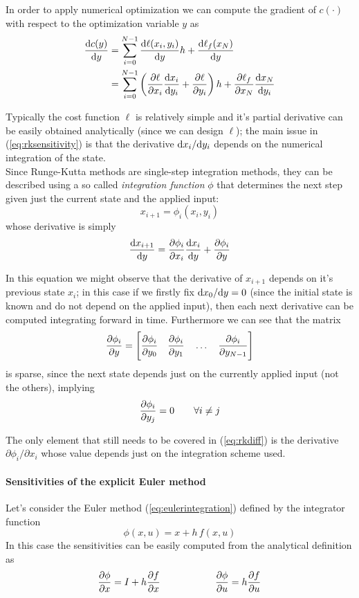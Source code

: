 	In order to apply numerical optimization we can compute the gradient of $c(\cdot)$ with respect to the optimization variable $y$ as
	\begin{equation} \label{eq:rksensitivity}
	\begin{aligned}
		\frac{\mathrm{d} c(y)}{\mathrm{d} y} & = \sum_{i=0}^{N-1} \frac{\mathrm{d} \ell(x_i,y_i)}{\mathrm{d} y} h + \frac{\mathrm{d} \ell_f(x_N)}{\mathrm{d} y} \\
		& = \sum_{i=0}^{N-1} \left( \frac{\partial \ell}{\partial x_i} \frac{\mathrm{d} x_i}{\mathrm{d} y_i} + \frac{\partial \ell}{\partial y_i} \right) h + \frac{\partial \ell_f}{\partial x_N} \frac{\mathrm{d} x_N}{\mathrm{d} y_i}
	\end{aligned}
	\end{equation}

	Typically the cost function $\ell$ is relatively simple and it's partial derivative can be easily obtained analytically (since we can design $\ell$); the main issue in (\ref{eq:rksensitivity}) is that the derivative $\mathrm{d} x_i / \mathrm{d} y_i$ depends on the numerical integration of the state. \\
	Since Runge-Kutta methods are single-step integration methods, they can be described using a so called \textit{integration function} $\phi$ that determines the next step given just the current state and the applied input:
	\[ x_{i+1} = \phi_i (x_i,y_i) \]
	whose derivative is simply
	\begin{equation} \label{eq:rkdiff}
		\frac{\mathrm{d} x_{i+1}}{\mathrm{d} y} = \frac{\partial \phi_i}{\partial x_i} \frac{\mathrm{d} x_i}{\mathrm{d} y} + \frac{\partial \phi_i}{\partial y}
	\end{equation}
	
	In this equation we might observe that the derivative of $x_{i+1}$ depends on it's previous state $x_i$; in this case if we firstly fix $\mathrm{d} x_0 / \mathrm{d} y = 0$ (since the initial state is known and do not depend on the applied input), then each next derivative can be computed integrating forward in time. Furthermore we can see that the matrix
	\[ \frac{\partial \phi_i}{\partial y} = \Bigg[ \frac{\partial \phi_i}{\partial y_0} \quad \frac{\partial \phi_i}{\partial y_1} \quad \dots \quad \frac{\partial \phi_i}{\partial y_{N-1}}  \Bigg] \]
	is sparse, since the next state depends just on the currently applied input (not the others), implying
	\[ \frac{\partial \phi_i}{\partial y_j} = 0 \qquad \forall i \neq j \]
	
	The only element that still needs to be covered in (\ref{eq:rkdiff}) is the derivative $\partial \phi_i/\partial x_i$ whose value depends just on the integration scheme used.
	
	\paragraph{Sensitivities of the explicit Euler method} Let's consider the Euler method (\ref{eq:eulerintegration}) defined by the integrator function
	\[ \phi(x,u) = x + h\, f(x,u) \]
	In this case the sensitivities can be easily computed from the analytical definition as
	\[ \frac{\partial \phi}{\partial x} = I + h \frac{\partial f}{\partial x} \hspace{2cm} \frac{\partial \phi}{\partial u} = h \frac{\partial f}{\partial u} \]
	
